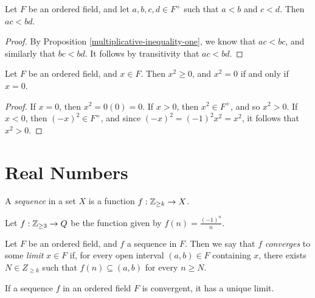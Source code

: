 \begin{prop}\label{multiplicative-inequality-two}
    Let $F$ be an ordered field, and let $a, b, c, d \in F^+$ such that $a < b$ and $c < d$. Then $ac < bd$.
\end{prop}

\begin{proof}
    By Proposition \ref{multiplicative-inequality-one}, we know that $ac < bc$, and similarly that $bc < bd$. It follows by transitivity that $ac < bd$.
\end{proof}

\begin{prop}\label{square-is-positive-or-zero}
    Let $F$ be an ordered field, and $x \in F$. Then $x^2 \geq 0$, and $x^2 = 0$ if and only if $x = 0$.
\end{prop}

\begin{proof}
    If $x = 0$, then $x^2 = 0(0) = 0$. If $x > 0$, then $x^2 \in F^+$, and so $x^2 > 0$. If $x < 0$, then $(-x)^2 \in F^+$, and since $(-x)^2 = (-1)^2x^2 = x^2$, it follows that $x^2 > 0$.
\end{proof}

\section{Real Numbers}

\begin{defn}
    A \emph{sequence} in a set $X$ is a function $f: \mathbb{Z}_{\geq k} \to X$.
\end{defn}

\begin{exmp}
    Let $f: \mathbb{Z}_{\geq 3} \to Q$ be the function given by $f(n) = \frac{(-1)^n}{n}$.
\end{exmp}

\begin{defn}
    Let $F$ be an ordered field, and $f$ a sequence in $F$. Then we say that $f$ \emph{converges} to some \emph{limit} $x \in F$ if, for every open interval $(a, b) \in F$ containing $x$, there exists $N \in Z_{\geq k}$ such that $f(n) \subseteq (a, b)$ for every $n \geq N$.
\end{defn}

\begin{thm}
    If a sequence $f$ in an ordered field $F$ is convergent, it has a unique limit.
\end{thm}

